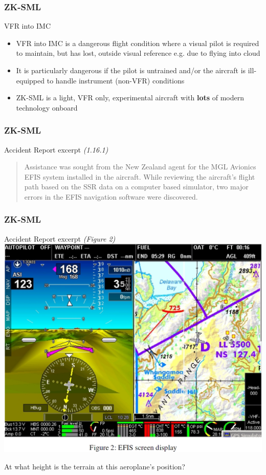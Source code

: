 \begin{frame}
\frametitle{ZK-SML}
\begin{block}{VFR into IMC}
\begin{itemize}
\item<1-> VFR into IMC is a dangerous flight condition where a visual pilot is required to maintain, but has lost, outside visual reference e.g. due to flying into cloud
\item<2-> It is particularly dangerous if the pilot is untrained and/or the aircraft is ill-equipped to handle instrument (non-VFR) conditions
\item<3-> ZK-SML is a light, VFR only, experimental aircraft with \textbf{lots} of modern technology onboard
\end{itemize}
\end{block}
\end{frame}

\begin{frame}
\frametitle{ZK-SML}
\begin{block}{Accident Report excerpt \tiny{\emph{(1.16.1)}}}
\begin{quote}
Assistance was sought from the New Zealand agent for the MGL Avionics EFIS system installed in the aircraft.  While reviewing the aircraft's flight path based on the SSR data on a computer based simulator, two major errors in the EFIS navigation software were discovered. 
\end{quote}
\end{block}
\end{frame}

\begin{frame}
\frametitle{ZK-SML}
\begin{block}{Accident Report excerpt \tiny{\emph{(Figure 2)}}}
\includegraphics[height=0.7\textheight]{image/zk-sml-map.png}
\end{block}
\tiny{At what height is the terrain at this aeroplane's position?}
\end{frame}

